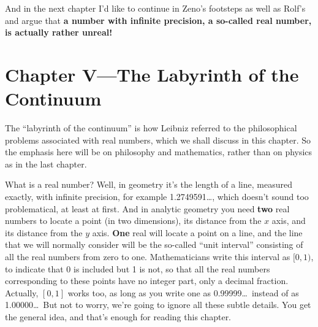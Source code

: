 \documentclass[12pt]{book}
\begin{document}
And in the next chapter I'd like to continue in Zeno's footsteps as well as Rolf's and argue
that \textbf{a number with infinite precision, a so-called real number, is actually
rather unreal!}

\chapter*{Chapter V---The Labyrinth of the Continuum}

The ``labyrinth of the continuum'' is how Leibniz referred to the philosophical problems
associated with real numbers, which we shall discuss in this chapter.
So the emphasis here will be on philosophy and mathematics, rather than on physics as
in the last chapter.
 
What is a real number? Well, in geometry
it's the length of a line, measured exactly, with infinite
precision, for example 1.2749591\ldots, which doesn't sound too problematical, 
at least at first.
And in analytic
geometry you need \textbf{two} real numbers to locate a point (in two dimensions), its
distance from the $x$ axis, and its distance from the $y$ axis.
\textbf{One} real will locate a point on a line,
and the line that we will normally consider will be the so-called ``unit interval''
consisting of all the real numbers from zero to one.
Mathematicians write this interval as $[0,1)$,  to indicate that 0 is included but 1 is not,
so that all the real numbers corresponding to these points have no integer part,
only a decimal fraction.
Actually, $[0,1]$ works too, as long as you write one as 0.99999\ldots\ instead of as 1.00000\ldots\
But not to worry, we're going to ignore all these subtle details. You get the general 
idea, and that's enough for reading this chapter.

\medskip
\end{document}
